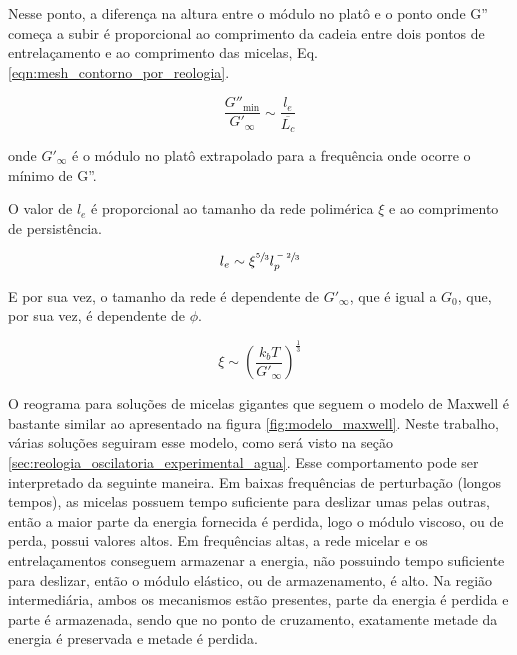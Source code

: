 		Nesse ponto, a diferença na altura entre o módulo no platô e o ponto onde G'' começa a subir é proporcional ao comprimento da cadeia entre dois pontos de entrelaçamento e ao comprimento das micelas, Eq. \ref{eqn:mesh_contorno_por_reologia}. 
		
		\begin{equation}
			\frac{G''_\mathrm{min}}{G'_\infty} \sim \frac{l_e}{\overline{L_c}}
			\label{eqn:mesh_contorno_por_reologia}
		\end{equation} %

		\noindent onde \(G'_\infty\) é o módulo no platô extrapolado para a frequência onde ocorre o mínimo de G''.
		
		O valor de \(l_e\) é proporcional ao tamanho da rede polimérica \(\xi\) e ao comprimento de persistência.
		
		\begin{equation}
			l_e \sim \xi^{\sfrac{5}{3}} l_p^{\sfrac{-2}{3}}
			\label{eqn:mesh_comprimento_entrelacamento}
		\end{equation} %
		
		E por sua vez, o tamanho da rede é dependente de \(G'_\infty\), que é igual a \(G_0\), que, por sua vez, é dependente de \(\phi\).
		
		\begin{equation}
			\xi \sim \left(  \frac{k_bT}{G'_\infty} \right) ^ \frac{1}{3}
		\end{equation} %
		
		
		O reograma para soluções de micelas gigantes que seguem o modelo de Maxwell é bastante similar ao apresentado na figura \ref{fig:modelo_maxwell}. Neste trabalho, várias soluções seguiram esse modelo, como será visto na seção \ref{sec:reologia_oscilatoria_experimental_agua}.
		Esse comportamento pode ser interpretado da seguinte maneira. Em baixas frequências de perturbação (longos tempos), as micelas possuem tempo suficiente para deslizar umas pelas outras, então a maior parte da energia fornecida é perdida, logo o módulo viscoso, ou de perda, possui valores altos. Em frequências altas, a rede micelar e os entrelaçamentos conseguem armazenar a energia, não possuindo tempo suficiente para deslizar, então o módulo elástico, ou de armazenamento, é alto. Na região intermediária, ambos os mecanismos estão presentes, parte da energia é perdida e parte é armazenada, sendo que no ponto de cruzamento, exatamente metade da energia é preservada e metade é perdida.
		
